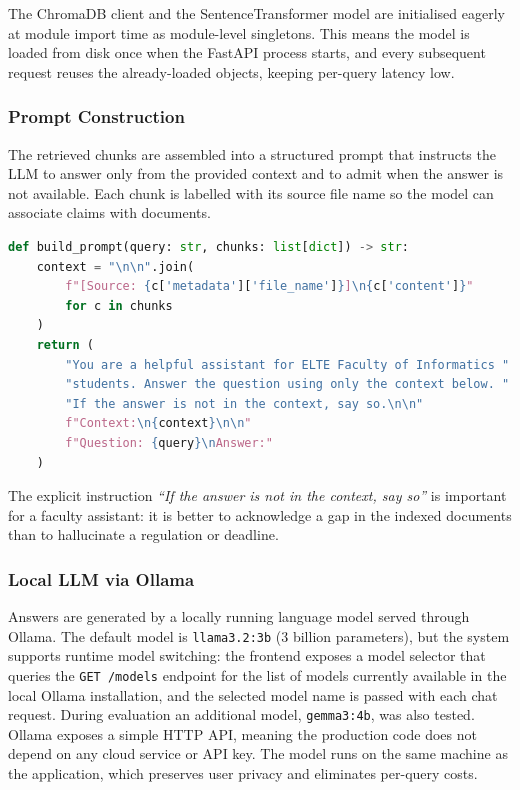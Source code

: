 The ChromaDB client and the SentenceTransformer model are initialised eagerly at module import time as module-level singletons. This means the model is loaded from disk once when the FastAPI process starts, and every subsequent request reuses the already-loaded objects, keeping per-query latency low.

\subsubsection{Prompt Construction}

The retrieved chunks are assembled into a structured prompt that instructs the LLM to answer only from the provided context and to admit when the answer is not available. Each chunk is labelled with its source file name so the model can associate claims with documents.

\begin{lstlisting}[language=Python]
def build_prompt(query: str, chunks: list[dict]) -> str:
    context = "\n\n".join(
        f"[Source: {c['metadata']['file_name']}]\n{c['content']}"
        for c in chunks
    )
    return (
        "You are a helpful assistant for ELTE Faculty of Informatics "
        "students. Answer the question using only the context below. "
        "If the answer is not in the context, say so.\n\n"
        f"Context:\n{context}\n\n"
        f"Question: {query}\nAnswer:"
    )
\end{lstlisting}

The explicit instruction \emph{``If the answer is not in the context, say so''} is important for a faculty assistant: it is better to acknowledge a gap in the indexed documents than to hallucinate a regulation or deadline.

\subsubsection{Local LLM via Ollama}

Answers are generated by a locally running language model served through Ollama. The default model is \texttt{llama3.2:3b} (3 billion parameters), but the system supports runtime model switching: the frontend exposes a model selector that queries the \texttt{GET /models} endpoint for the list of models currently available in the local Ollama installation, and the selected model name is passed with each chat request. During evaluation an additional model, \texttt{gemma3:4b}, was also tested. Ollama exposes a simple HTTP API, meaning the production code does not depend on any cloud service or API key. The model runs on the same machine as the application, which preserves user privacy and eliminates per-query costs.

